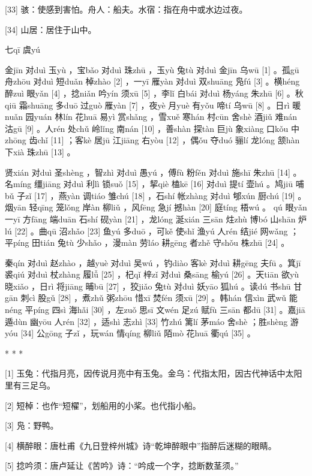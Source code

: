 \documentclass[12pt,UTF8]{ctexbook}
\begin{document}
[33] 骇：使感到害怕。舟人：船夫。水宿：指在舟中或水边过夜。

[34] 山居：居住于山中。





七qī 虞yú


金jīn 对duì 玉yù ，宝bǎo 对duì 珠zhū ，玉yù 兔tù 对duì 金jīn 乌wū [1] 。孤gū 舟zhōu 对duì 短duǎn 棹zhào [2] ，一yī 雁yàn 对duì 双shuāng 凫fú [3] 。横héng 醉zuì 眼yǎn [4] ，捻niǎn 吟yín 须xū [5] ，李lǐ 白bái 对duì 杨yáng 朱zhū [6] 。秋qiū 霜shuāng 多duō 过guò 雁yàn [7] ，夜yè 月yuè 有yǒu 啼tí 乌wū [8] 。日rì 暖nuǎn 园yuán 林lín 花huā 易yì 赏shǎng ，雪xuě 寒hán 村cūn 舍shè 酒jiǔ 难nán 沽gū [9] 。人rén 处chǔ 岭lǐng 南nán [10] ，善shàn 探tàn 巨jù 象xiàng 口kǒu 中zhōng 齿chǐ [11] ；客kè 居jū 江jiāng 右yòu [12] ，偶ǒu 夺duó 骊lí 龙lóng 颔hàn 下xià 珠zhū [13] 。

贤xián 对duì 圣shèng ，智zhì 对duì 愚yú ，傅fù 粉fěn 对duì 施shī 朱zhū [14] 。名míng 缰jiāng 对duì 利lì 锁suǒ [15] ，挈qiè 榼kē [16] 对duì 提tí 壶hú 。鸠jiū 哺bǔ 子zǐ [17] ，燕yàn 调tiáo 雏chú [18] ，石shí 帐zhàng 对duì 郇xún 厨chú [19] 。烟yān 轻qīng 笼lǒng 岸àn 柳liǔ ，风fēng 急jí 撼hàn [20] 庭tíng 梧wú 。 qú 眼yǎn 一yī 方fāng 端duān 石shí 砚yàn [21] ，龙lóng 涎xián 三sān 炷zhù 博bó 山shān 炉lú [22] 。曲qū 沼zhǎo [23] 鱼yú 多duō ，可kě 使shǐ 渔yú 人rén 结jié 网wǎng ；平píng 田tián 兔tù 少shǎo ，漫màn 劳láo 耕gēng 者zhě 守shǒu 株zhū [24] 。

秦qín 对duì 赵zhào ，越yuè 对duì 吴wú ，钓diào 客kè 对duì 耕gēng 夫fū 。箕jī 裘qiú 对duì 杖zhàng 履lǚ [25] ，杞qǐ 梓zǐ 对duì 桑sāng 榆yú [26] 。天tiān 欲yù 晓xiǎo ，日rì 将jiāng 晡bū [27] ，狡jiǎo 兔tù 对duì 妖yāo 狐hú 。读dú 书shū 甘gān 刺cì 股gǔ [28] ，煮zhǔ 粥zhōu 惜xī 焚fén 须xū [29] 。韩hán 信xìn 武wǔ 能néng 平píng 四sì 海hǎi [30] ，左zuǒ 思sī 文wén 足zú 赋fù 三sān 都dū [31] 。嘉jiā 遁dùn 幽yōu 人rén [32] ，适shì 志zhì [33] 竹zhú 篱lí 茅máo 舍shè ；胜shèng 游yóu [34] 公gōng 子zǐ ，玩wán 情qíng 柳liǔ 陌mò 花huā 衢qú [35] 。



* * *



[1] 玉兔：代指月亮，因传说月亮中有玉兔。金乌：代指太阳，因古代神话中太阳里有三足乌。

[2] 短棹：也作“短櫂”，划船用的小桨。也代指小船。

[3] 凫：野鸭。

[4] 横醉眼：唐杜甫《九日登梓州城》诗“乾坤醉眼中”指醉后迷糊的眼睛。

[5] 捻吟须：唐卢延让《苦吟》诗：“吟成一个字，捻断数茎须。”
\end{document}

